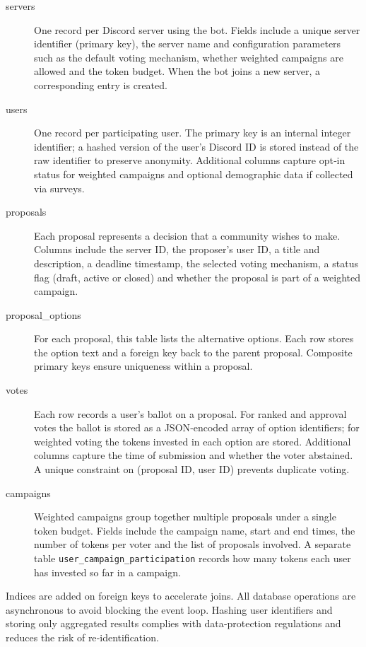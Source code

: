 \begin{description}
    \item[servers] One record per Discord server using the bot.  Fields
    include a unique server identifier (primary key), the server name
    and configuration parameters such as the default voting mechanism,
    whether weighted campaigns are allowed and the token budget.  When
    the bot joins a new server, a corresponding entry is created.
    \item[users] One record per participating user.  The primary key is
    an internal integer identifier; a hashed version of the user’s
    Discord ID is stored instead of the raw identifier to preserve
    anonymity.  Additional columns capture opt‑in status for weighted
    campaigns and optional demographic data if collected via surveys.
    \item[proposals] Each proposal represents a decision that a
    community wishes to make.  Columns include the server ID, the
    proposer’s user ID, a title and description, a deadline timestamp,
    the selected voting mechanism, a status flag (draft, active or
    closed) and whether the proposal is part of a weighted campaign.
    \item[proposal\_options] For each proposal, this table lists the
    alternative options.  Each row stores the option text and a
    foreign key back to the parent proposal.  Composite primary keys
    ensure uniqueness within a proposal.
    \item[votes] Each row records a user’s ballot on a proposal.  For
    ranked and approval votes the ballot is stored as a JSON‑encoded
    array of option identifiers; for weighted voting the tokens
    invested in each option are stored.  Additional columns capture
    the time of submission and whether the voter abstained.  A unique
    constraint on (proposal ID, user ID) prevents duplicate voting.
    \item[campaigns] Weighted campaigns group together multiple
    proposals under a single token budget.  Fields include the
    campaign name, start and end times, the number of tokens per voter
    and the list of proposals involved.  A separate table
    \texttt{user\_campaign\_participation} records how many tokens
    each user has invested so far in a campaign.
\end{description}

Indices are added on foreign keys to accelerate joins.  All database
operations are asynchronous to avoid blocking the event loop.  Hashing
user identifiers and storing only aggregated results complies with
data‑protection regulations and reduces the risk of re‑identification.

